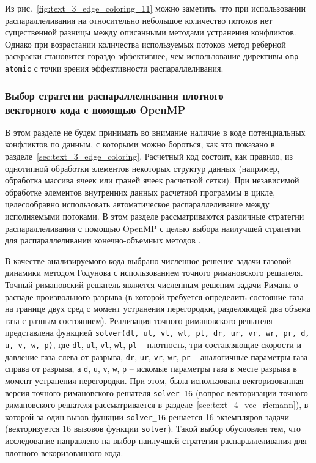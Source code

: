 Из рис.~\ref{fig:text_3_edge_coloring_11} можно заметить, что при использовании распараллеливания на относительно небольшое количество потоков нет существенной разницы между описанными методами устранения конфликтов.
Однако при возрастании количества используемых потоков метод реберной раскраски становится гораздо эффективнее, чем использование директивы \texttt{omp atomic} с точки зрения эффективности распараллеливания.

\subsubsection{Выбор стратегии распараллеливания плотного \\ векторного кода с помощью OpenMP}\label{abbr:openmp3}

В этом разделе не будем принимать во внимание наличие в коде потенциальных конфликтов по данным, с которыми можно бороться, как это показано в разделе~\ref{sec:text_3_edge_coloring}.
Расчетный код состоит, как правило, из однотипной обработки элементов некоторых структур данных (например, обработка массива ячеек или граней ячеек расчетной сетки).
При независимой обработке элементов внутренних данных расчетной программы в цикле, целесообравно использовать автоматическое распараллеливание между исполняемыми потоками.
В этом разделе рассматриваются различные стратегии распараллеливания с помощью OpenMP \cite{OpenMP6} с целью выбора наилучшей стратегии для распараллеливании конечно-объемных методов \cite{Vorobyov2020ParVec}.

В качестве анализируемого кода выбрано численное решение задачи газовой динамики методом Годунова\label{term:godunov_method2} с использованием точного римановского решателя\label{term:riemann_solver2}.
Точный римановский решатель является численным решеним задачи Римана о распаде произвольного разрыва (в которой требуется определить состояние газа на границе двух сред с момент устранения перегородки, разделяющей два объема газа с разным состоянием).
Реализация точного римановского решателя \cite{riemannvecGithub} представлена функцией \texttt{solver(dl, ul, vl, wl, pl, dr, ur, vr, wr, pr, d, u, v, w, p)}, где \texttt{dl}, \texttt{ul}, \texttt{vl}, \texttt{wl}, \texttt{pl} -- плотность, три составляющие скорости и давление газа слева от разрыва, \texttt{dr}, \texttt{ur}, \texttt{vr}, \texttt{wr}, \texttt{pr} -- аналогичные параметры газа справа от разрыва, а \texttt{d}, \texttt{u}, \texttt{v}, \texttt{w}, \texttt{p} -- искомые параметры газа в месте разрыва в момент устранения перегородки.
При этом, была использована векторизованная версия точного римановского решателя \texttt{solver\_16} (вопрос векторизации точного римановского решателя рассматривается в разделе~\ref{sec:text_4_vec_riemann}), в которой за один вызов функции \texttt{solver\_16} решается 16 экземпляров задачи (векторизуется 16 вызовов функции \texttt{solver}).
Такой выбор обусловлен тем, что исследование направлено на выбор наилучшей стратегии распараллеливания для плотного векоризованного кода.

